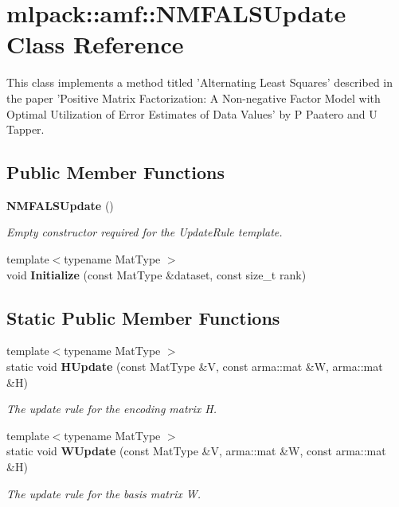 \section{mlpack\-:\-:amf\-:\-:N\-M\-F\-A\-L\-S\-Update Class Reference}
\label{classmlpack_1_1amf_1_1NMFALSUpdate}


This class implements a method titled 'Alternating Least Squares' described in the paper 'Positive Matrix Factorization\-: A Non-\/negative Factor Model with Optimal Utilization of Error Estimates of Data Values' by P Paatero and U Tapper.  


\subsection*{Public Member Functions}
\begin{DoxyCompactItemize}
\item 
{\bf N\-M\-F\-A\-L\-S\-Update} ()
\begin{DoxyCompactList}\small\item\em Empty constructor required for the Update\-Rule template. \end{DoxyCompactList}\item 
{\footnotesize template$<$typename Mat\-Type $>$ }\\void {\bf Initialize} (const Mat\-Type \&dataset, const size\-\_\-t rank)
\end{DoxyCompactItemize}
\subsection*{Static Public Member Functions}
\begin{DoxyCompactItemize}
\item 
{\footnotesize template$<$typename Mat\-Type $>$ }\\static void {\bf H\-Update} (const Mat\-Type \&V, const arma\-::mat \&W, arma\-::mat \&H)
\begin{DoxyCompactList}\small\item\em The update rule for the encoding matrix H. \end{DoxyCompactList}\item 
{\footnotesize template$<$typename Mat\-Type $>$ }\\static void {\bf W\-Update} (const Mat\-Type \&V, arma\-::mat \&W, const arma\-::mat \&H)
\begin{DoxyCompactList}\small\item\em The update rule for the basis matrix W. \end{DoxyCompactList}\end{DoxyCompactItemize}


